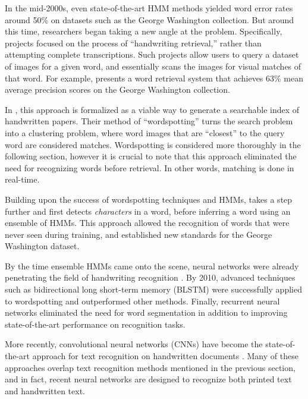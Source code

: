 \documentclass[final]{ukthesis}
\begin{document}
In the mid-2000s, even state-of-the-art HMM methods yielded word error rates around 50\% on datasets such as the George Washington collection. But around this time, researchers began taking a new angle at the problem. Specifically, projects focused on the process of ``handwriting retrieval,'' rather than attempting complete transcriptions. Such projects allow users to query a dataset of images for a given word, and essentially scans the images for visual matches of that word. For example, \cite{rath2004search} presents a word retrieval system that achieves 63\% mean average precision scores on the George Washington collection.

In \cite{rath2007word}, this approach is formalized as a viable way to generate a searchable index of handwritten papers. Their method of ``wordspotting'' turns the search problem into a clustering problem, where word images that are ``closest'' to the query word are considered matches. Wordspotting is considered more thoroughly in the following section, however it is crucial to note that this approach eliminated the need for recognizing words before retrieval. In other words, matching is done in real-time.

Building upon the success of wordspotting techniques and HMMs, \cite{howe2009finding} takes a step further and first detects {\em characters} in a word, before inferring a word using an ensemble of HMMs. This approach allowed the recognition of words that were never seen during training, and established new standards for the George Washington dataset.

By the time ensemble HMMs came onto the scene, neural networks were already penetrating the field of handwriting recognition \cite{fernandez2007application}. By 2010, advanced techniques such as bidirectional long short-term memory (BLSTM) were successfully applied to wordspotting \cite{wang2010word} and outperformed other methods. Finally, recurrent neural networks \cite{frinken2012novel} eliminated the need for word segmentation in addition to improving state-of-the-art performance on recognition tasks.

More recently, convolutional neural networks (CNNs) have become the state-of-the-art approach for text recognition on handwritten documents \cite{zhong2016spottingnet,sudholt2016phocnet}. Many of these approaches overlap text recognition methods mentioned in the previous section, and in fact, recent neural networks are designed to recognize both printed text and handwritten text.
\end{document}
